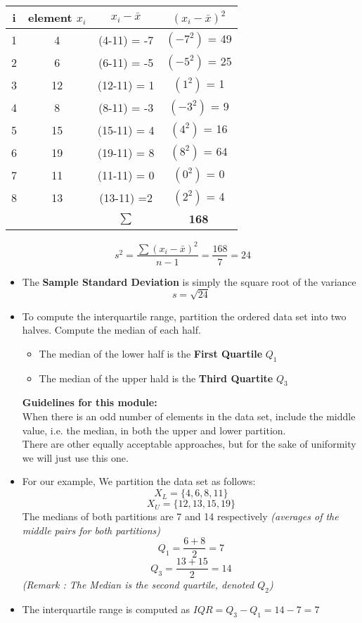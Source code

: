 \documentclass[a4paper,12pt]{article}
\begin{document}
\begin{center}
	{
		
		\begin{tabular}{|c|c|c|c|}
			\hline \phantom{spa}i\phantom{sap} & \phantom{sp}element $x_i$\phantom{sp} & \phantom{sp}$x_i-\bar{x}$ \phantom{sp}&\phantom{sp} $(x_i-\bar{x})^2$\phantom{sp}   \\ \hline
			\hline  1& 4 & (4-11) = -7 & $(-7^2)$ = 49   \\ 
			\hline  2& 6 & (6-11) = -5 & $(-5^2)$ = 25   \\ 
			\hline  3& 12 & (12-11) = 1 & $(1^2)$ = 1   \\ 
			\hline  4& 8 & (8-11) = -3 & $(-3^2)$ = 9  \\ 
			\hline  5& 15 & (15-11) = 4 & $(4^2)$ = 16   \\ 
			\hline  6& 19 & (19-11) = 8 & $(8^2)$ = 64   \\ 
			\hline  7& 11 & (11-11) = 0 & $(0^2)$ = 0   \\ 
			\hline  8& 13 &  (13-11) =2 & $(2^2)$ = 4   \\ \hline
			\hline & & {\Large \phantom{spacesp}}$\sum$ & \textbf{168} \\
			\hline 
		\end{tabular} 
	}
	
	
\end{center}

\[ s^2 = \frac{\sum(x_i - \bar{x})^2}{n-1} = \frac{168}{7} = 24 \]
\begin{itemize}
	\item The \textbf{Sample Standard Deviation} is simply the square root of the variance
	\[s = \sqrt{24} \]
	\item To compute the interquartile range, partition the ordered data set into two halves. Compute the median of each half.
	\begin{itemize}
		\item The median of the lower half is the \textbf{First Quartile} $Q_1$
		\item The median of the upper hald is the \textbf{Third Quartite} $Q_3$
	\end{itemize}
	\begin{framed}
		\textbf{Guidelines for this module:}\\ When there is an odd number of elements in the data set, include the middle value, i.e. the median, in both the upper and lower partition.\\ There are other equally acceptable approaches, but for the sake of uniformity we will just use this one.
	\end{framed}
	
	\item For our example, We partition the data set as follows:
	\[X_L =\{ 4, 6, 8, 11 \}\]
	\[X_U = \{12, 13, 15, 19\}\]
	The medians of both partitions are 7 and 14 respectively \textit{(averages of the middle pairs for both partitions)}
	\[Q_1 = \frac{6+8}{2} = 7\]
	\[Q_3 = \frac{13+15}{2} = 14\]
	\textit{(Remark : The Median is the second quartile, denoted $Q_2$)}
	\item The interquartile range is computed as $IQR = Q_3-Q_1 = 14-7 = 7$
\end{itemize}
\end{document}
